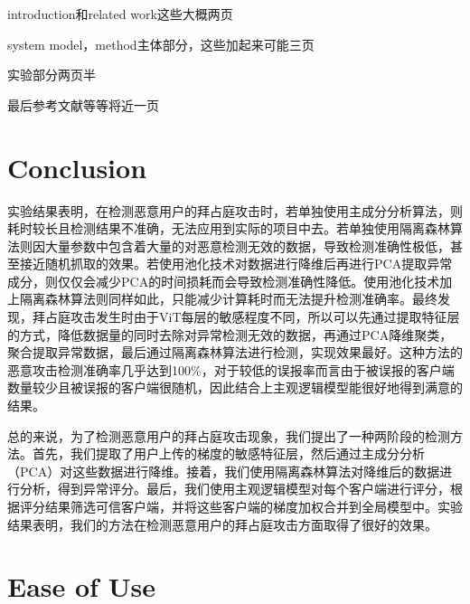 \documentclass[conference]{IEEEtran}
\begin{document}
introduction和related work这些大概两页

system model，method主体部分，这些加起来可能三页

实验部分两页半

最后参考文献等等将近一页

\section{Conclusion}
\label{sec:conclusion}




实验结果表明，在检测恶意用户的拜占庭攻击时，若单独使用主成分分析算法，则耗时较长且检测结果不准确，无法应用到实际的项目中去。若单独使用隔离森林算法则因大量参数中包含着大量的对恶意检测无效的数据，导致检测准确性极低，甚至接近随机抓取的效果。若使用池化技术\cite{betterTogether}对数据进行降维后再进行PCA提取异常成分，则仅仅会减少PCA的时间损耗而会导致检测准确性降低。使用池化技术加上隔离森林算法则同样如此，只能减少计算耗时而无法提升检测准确率。最终发现，拜占庭攻击发生时由于ViT每层的敏感程度不同，所以可以先通过提取特征层的方式，降低数据量的同时去除对异常检测无效的数据，再通过PCA降维聚类，聚合提取异常数据，最后通过隔离森林算法进行检测，实现效果最好。这种方法的恶意攻击检测准确率几乎达到100\%，对于较低的误报率而言由于被误报的客户端数量较少且被误报的客户端很随机，因此结合上主观逻辑模型能很好地得到满意的结果。

总的来说，为了检测恶意用户的拜占庭攻击现象，我们提出了一种两阶段的检测方法。首先，我们提取了用户上传的梯度的敏感特征层，然后通过主成分分析（PCA）对这些数据进行降维。接着，我们使用隔离森林算法对降维后的数据进行分析，得到异常评分。最后，我们使用主观逻辑模型对每个客户端进行评分，根据评分结果筛选可信客户端，并将这些客户端的梯度加权合并到全局模型中。实验结果表明，我们的方法在检测恶意用户的拜占庭攻击方面取得了很好的效果。

\section{Ease of Use}
\end{document}
